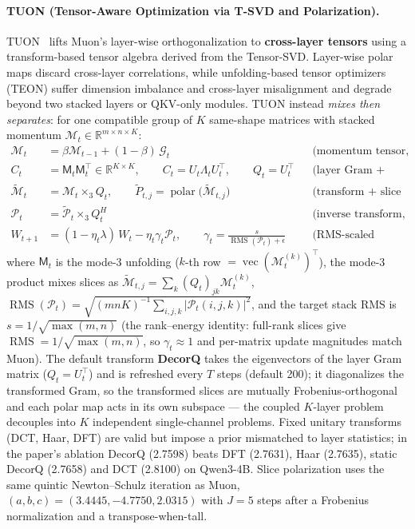 \paragraph{TUON (Tensor-Aware Optimization via T-SVD and Polarization).}
TUON~\citep{tang_tuon_2026} lifts Muon's layer-wise orthogonalization to
\textbf{cross-layer tensors} using a transform-based tensor algebra derived from the
Tensor-SVD. Layer-wise polar maps discard cross-layer correlations, while
unfolding-based tensor optimizers (TEON) suffer dimension imbalance and cross-layer
misalignment and degrade beyond two stacked layers or QKV-only modules. TUON instead
\emph{mixes then separates}: for one compatible group of $K$ same-shape matrices with
stacked momentum $\mathcal{M}_t \in \mathbb{R}^{m \times n \times K}$:
\begin{align}
\mathcal{M}_t &= \beta \mathcal{M}_{t-1} + (1-\beta)\, \mathcal{G}_t
  && \text{(momentum tensor, Alg.~1 line 2)} \\
C_t &= \mathsf{M}_t \mathsf{M}_t^{\top} \in \mathbb{R}^{K \times K}, \qquad
C_t = U_t \Lambda_t U_t^{\top}, \qquad Q_t = U_t^{\top}
  && \text{(layer Gram + eigendecomposition, lines 3--5)} \\
\widetilde{\mathcal{M}}_t &= \mathcal{M}_t \times_3 Q_t, \qquad
\widetilde{P}_{t,j} = \operatorname{polar}\!\big(\widetilde{\mathcal{M}}_{t,j}\big)
  && \text{(transform + slice polarization, lines 6--9)} \\
\mathcal{P}_t &= \widetilde{\mathcal{P}}_t \times_3 Q_t^{H}
  && \text{(inverse transform, line 10)} \\
W_{t+1} &= (1 - \eta_t \lambda)\, W_t - \eta_t \gamma_t \mathcal{P}_t, \qquad
\gamma_t = \frac{s}{\operatorname{RMS}(\mathcal{P}_t) + \epsilon}
  && \text{(RMS-scaled update, line 11)}
\end{align}
where $\mathsf{M}_t$ is the mode-3 unfolding ($k$-th row
$= \operatorname{vec}(\mathcal{M}_t^{(k)})^{\top}$), the mode-3 product mixes slices as
$\widetilde{\mathcal{M}}_{t,j} = \sum_k (Q_t)_{jk} \mathcal{M}_t^{(k)}$,
$\operatorname{RMS}(\mathcal{P}_t) = \sqrt{(mnK)^{-1} \sum_{i,j,k} |\mathcal{P}_t(i,j,k)|^2}$,
and the target stack RMS is $s = 1/\sqrt{\max(m,n)}$ (the rank--energy identity: full-rank
slices give $\operatorname{RMS} = 1/\sqrt{\max(m,n)}$, so $\gamma_t \approx 1$ and
per-matrix update magnitudes match Muon). The default transform \textbf{DecorQ} takes the
eigenvectors of the layer Gram matrix ($Q_t = U_t^{\top}$) and is refreshed every $T$
steps (default 200); it diagonalizes the transformed Gram, so the transformed slices are
mutually Frobenius-orthogonal and each polar map acts in its own subspace --- the coupled
$K$-layer problem decouples into $K$ independent single-channel problems. Fixed unitary
transforms (DCT, Haar, DFT) are valid but impose a prior mismatched to layer statistics;
in the paper's ablation DecorQ (2.7598) beats DFT (2.7631), Haar (2.7635), static DecorQ
(2.7658) and DCT (2.8100) on Qwen3-4B. Slice polarization uses the same quintic
Newton--Schulz iteration as Muon, $(a,b,c) = (3.4445, -4.7750, 2.0315)$ with $J = 5$
steps after a Frobenius normalization and a transpose-when-tall.

